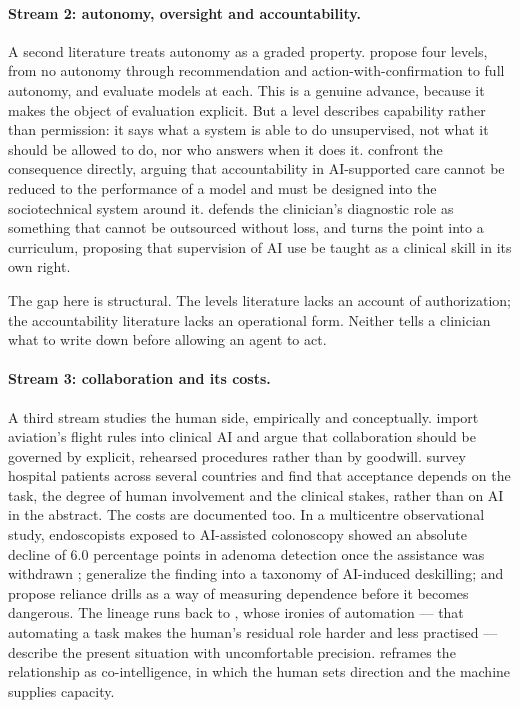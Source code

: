 \paragraph{Stream 2: autonomy, oversight and accountability.}
A second literature treats autonomy as a graded property. \citet{ye2025autonomy} propose four levels, from no autonomy through recommendation and action-with-confirmation to full autonomy, and evaluate models at each. This is a genuine advance, because it makes the object of evaluation explicit. But a level describes capability rather than permission: it says what a system is able to do unsupervised, not what it should be allowed to do, nor who answers when it does it. \citet{habli2020accountability} confront the consequence directly, arguing that accountability in AI-supported care cannot be reduced to the performance of a model and must be designed into the sociotechnical system around it. \citet{clayton2025clinicians} defends the clinician's diagnostic role as something that cannot be outsourced without loss, and \citet{abdulnour2025education} turns the point into a curriculum, proposing that supervision of AI use be taught as a clinical skill in its own right.

The gap here is structural. The levels literature lacks an account of authorization; the accountability literature lacks an operational form. Neither tells a clinician what to write down before allowing an agent to act.

\paragraph{Stream 3: collaboration and its costs.}
A third stream studies the human side, empirically and conceptually. \citet{ong2026flight} import aviation's flight rules into clinical AI and argue that collaboration should be governed by explicit, rehearsed procedures rather than by goodwill. \citet{busch2025attitudes} survey hospital patients across several countries and find that acceptance depends on the task, the degree of human involvement and the clinical stakes, rather than on AI in the abstract. The costs are documented too. In a multicentre observational study, endoscopists exposed to AI-assisted colonoscopy showed an absolute decline of 6.0 percentage points in adenoma detection once the assistance was withdrawn \citep{budzyn2025deskilling}; \citet{natali2025deskilling} generalize the finding into a taxonomy of AI-induced deskilling; and \citet{hunter2024reliance} propose reliance drills as a way of measuring dependence before it becomes dangerous. The lineage runs back to \citet{bainbridge1983}, whose ironies of automation --- that automating a task makes the human's residual role harder and less practised --- describe the present situation with uncomfortable precision. \citet{mollick2024} reframes the relationship as co-intelligence, in which the human sets direction and the machine supplies capacity.

